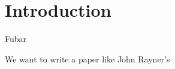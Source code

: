 \section{Introduction}
  
  Fubar
  
We want to write a paper like John Rayner's \cite{Rayner_2003}
  \cite{Vacca_2003}
  
  
  
  
  
  